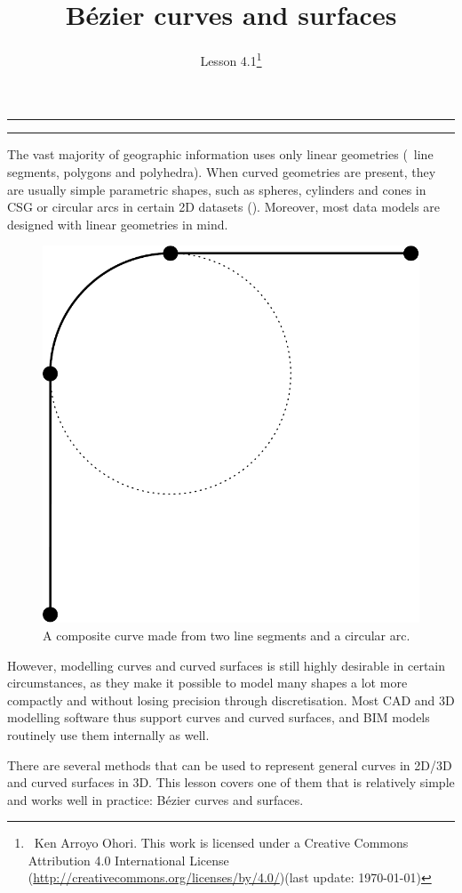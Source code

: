 
\newcommand{\lessonNumber}{Lesson 4.1}

\newtheorem{definition}{Definition}

\title{B\'ezier curves and surfaces}


\ohead*{\lessonNumber}
\titlehead{\thispagestyle{headings}}
\author{\lessonNumber\footnote{\ccbysa\ Ken Arroyo Ohori. This work is licensed under a Creative Commons Attribution 4.0 International License (\url{http://creativecommons.org/licenses/by/4.0/})\newline(last update: \today)}}
\date{}

\pagestyle{scrheadings}

\maketitle

\noindent\rule{5cm}{0.4pt}
\tableofcontents
\noindent\rule{5cm}{0.4pt}
\vspace{5mm}


The vast majority of geographic information uses only linear geometries (\ie\ line segments, polygons and polyhedra).
When curved geometries are present, they are usually simple parametric shapes, such as spheres, cylinders and cones in CSG or circular arcs in certain 2D datasets ().
Moreover, most data models are designed with linear geometries in mind.

\begin{figure}
\centering
\includegraphics[width=0.2\linewidth]{figs/circulararc}
\caption{A composite curve made from two line segments and a circular arc.}%
\label{fig:circulararc}
\end{figure}

However, modelling curves and curved surfaces is still highly desirable in certain circumstances, as they make it possible to model many shapes a lot more compactly and without losing precision through discretisation.
Most CAD and 3D modelling software thus support curves and curved surfaces, and BIM models routinely use them internally as well.

There are several methods that can be used to represent general curves in 2D/3D and curved surfaces in 3D.
This lesson covers one of them that is relatively simple and works well in practice: B\'ezier curves and surfaces.

